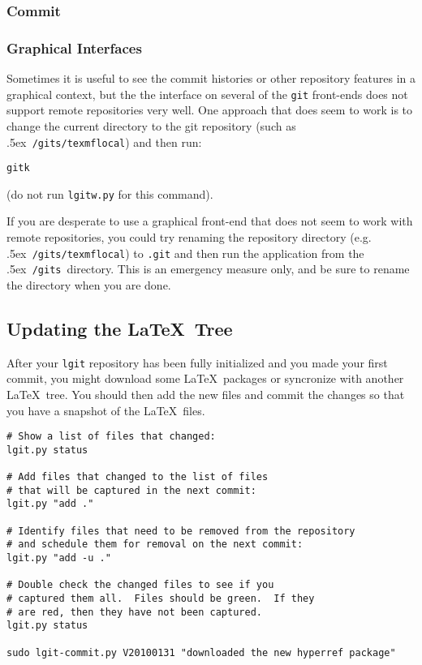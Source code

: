 \documentclass{ltxdoc}
\def\bobtilde{\lower.5ex\hbox{\tt \string~}}%
\def\ucmd#1{{\tt {#1}}}
\def\mygits{\bobtilde\ucmd{/gits}}
\begin{document}
\subsubsection{Commit}

\subsubsection{Graphical Interfaces}
Sometimes it is useful to see the commit histories or other repository features in a graphical context, but the the interface on several of the \ucmd{git} front-ends does not support remote repositories very well.  One approach that does seem to work is to change the current directory to the git repository (such as \mygits\ucmd{/texmflocal}) and then run:
\begin{verbatim}
gitk
\end{verbatim}
(do not run \ucmd{lgitw.py} for this command).

If you are desperate to use a graphical front-end that does not seem to work with remote repositories, you could try renaming the repository directory (e.g. \mygits\ucmd{/texmflocal}) to \ucmd{.git} and then run the application from the \mygits\ directory.  This is an emergency measure only, and be sure to rename the directory when you are done.


\subsection{Updating the \LaTeX\ Tree}
After your \ucmd{lgit} repository has been fully initialized and you made your first commit, you might download some \LaTeX\ packages or syncronize with another \LaTeX\ tree.  You should then add the new files and commit the changes so that you have a snapshot of the \LaTeX\ files.

\begin{verbatim}
# Show a list of files that changed:
lgit.py status

# Add files that changed to the list of files
# that will be captured in the next commit:
lgit.py "add ."

# Identify files that need to be removed from the repository
# and schedule them for removal on the next commit:
lgit.py "add -u ."

# Double check the changed files to see if you 
# captured them all.  Files should be green.  If they
# are red, then they have not been captured.
lgit.py status

sudo lgit-commit.py V20100131 "downloaded the new hyperref package"
\end{verbatim}
\end{document}
